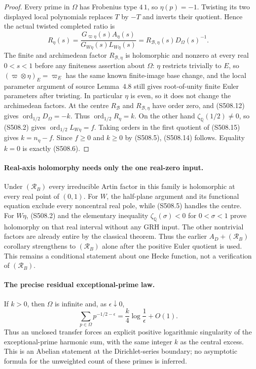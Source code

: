 \begin{proof}
Every prime in $\Omega$ has Frobenius type $4\,1$, so
$\eta(p)=-1$.  Twisting its two displayed local polynomials
replaces $T$ by $-T$ and inverts their quotient.  Hence the
actual twisted completed ratio is
\[
 R_\eta(s)=\frac{G_{\varpi\eta}(s)A_\eta(s)}
                     {G_{W\eta}(s)L_{W\eta}(s)}
          =R_{\mathcal B,\eta}(s)D_\Omega(s)^{-1}.
 \tag{S508.15}
\]
The finite and archimedean factor $R_{\mathcal B,\eta}$ is
holomorphic and nonzero at every real $0<s<1$ before any
finiteness assertion about $\Omega$: $\eta$ restricts trivially
to $E$, so $(\varpi\otimes\eta)_E=\varpi_E$ has the same
known finite-image base change, and the local parameter argument
of source Lemma~4.8 still gives root-of-unity finite Euler
parameters after twisting.  In particular $\eta$ is even,
so it does not change the archimedean factors.  At the centre $R_{\mathcal B}$ and
$R_{\mathcal B,\eta}$ have order zero, and (S508.12) gives
$\operatorname{ord}_{1/2}D_\Omega=-k$.  Thus
$\operatorname{ord}_{1/2}R_\eta=k$.
On the other hand $\zeta_{\mathbb Q}(1/2)\ne0$, so (S508.2)
gives $\operatorname{ord}_{1/2}L_{W\eta}=f$.
Taking orders in the first quotient of (S508.15) gives
$k=n_\eta-f$.  Since $f\ge0$ and $k\ge0$ by (S508.5),
(S508.14) follows.  Equality $k=0$ is exactly (S508.6).
\end{proof}

\paragraph{Real-axis holomorphy needs only the one real-zero input.}
Under $(\mathcal R_B)$ every irreducible Artin factor in this
family is holomorphic at every real point of $(0,1)$.
For $W$, the half-plane argument and its functional equation
exclude every noncentral real pole, while (S508.5) handles
the centre.  For $W\eta$, (S508.2) and the elementary inequality
$\zeta_{\mathbb Q}(\sigma)<0$ for $0<\sigma<1$ prove
holomorphy on that real interval without any GRH input.
The other nontrivial factors are already entire by the
classical theorem.  Thus the earlier $A_D+(\mathcal R_B)$
corollary strengthens to $(\mathcal R_B)$ alone after the
positive Euler quotient is used.  This remains a conditional
statement about one Hecke function, not a verification of
$(\mathcal R_B)$.

\paragraph{The precise residual exceptional-prime law.}
If $k>0$, then $\Omega$ is infinite and, as $\epsilon\downarrow0$,
\[
 \sum_{p\in\Omega}p^{-1/2-\epsilon}
          =\frac{k}{4}\log\frac1\epsilon+O(1).
 \tag{S508.16}
\]
Thus an unclosed transfer forces an explicit positive logarithmic
singularity of the exceptional-prime harmonic sum, with the
same integer $k$ as the central excess.  This is an Abelian
statement at the Dirichlet-series boundary; no asymptotic
formula for the unweighted count of these primes is inferred.

